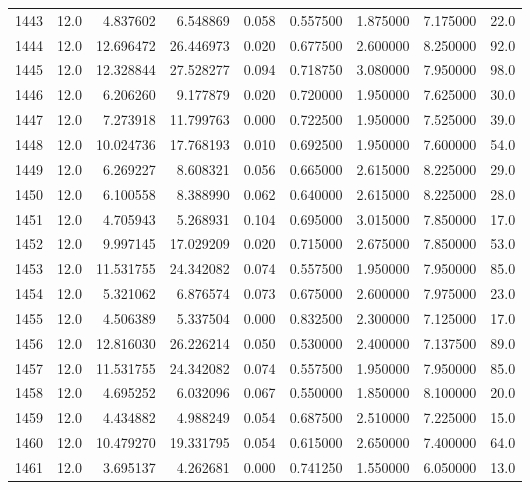 \begin{tabular}{lrrrrrrrr}
1443 &   12.0 &   4.837602 &   6.548869 &  0.058 &  0.557500 &  1.875000 &   7.175000 &   22.0 \\
1444 &   12.0 &  12.696472 &  26.446973 &  0.020 &  0.677500 &  2.600000 &   8.250000 &   92.0 \\
1445 &   12.0 &  12.328844 &  27.528277 &  0.094 &  0.718750 &  3.080000 &   7.950000 &   98.0 \\
1446 &   12.0 &   6.206260 &   9.177879 &  0.020 &  0.720000 &  1.950000 &   7.625000 &   30.0 \\
1447 &   12.0 &   7.273918 &  11.799763 &  0.000 &  0.722500 &  1.950000 &   7.525000 &   39.0 \\
1448 &   12.0 &  10.024736 &  17.768193 &  0.010 &  0.692500 &  1.950000 &   7.600000 &   54.0 \\
1449 &   12.0 &   6.269227 &   8.608321 &  0.056 &  0.665000 &  2.615000 &   8.225000 &   29.0 \\
1450 &   12.0 &   6.100558 &   8.388990 &  0.062 &  0.640000 &  2.615000 &   8.225000 &   28.0 \\
1451 &   12.0 &   4.705943 &   5.268931 &  0.104 &  0.695000 &  3.015000 &   7.850000 &   17.0 \\
1452 &   12.0 &   9.997145 &  17.029209 &  0.020 &  0.715000 &  2.675000 &   7.850000 &   53.0 \\
1453 &   12.0 &  11.531755 &  24.342082 &  0.074 &  0.557500 &  1.950000 &   7.950000 &   85.0 \\
1454 &   12.0 &   5.321062 &   6.876574 &  0.073 &  0.675000 &  2.600000 &   7.975000 &   23.0 \\
1455 &   12.0 &   4.506389 &   5.337504 &  0.000 &  0.832500 &  2.300000 &   7.125000 &   17.0 \\
1456 &   12.0 &  12.816030 &  26.226214 &  0.050 &  0.530000 &  2.400000 &   7.137500 &   89.0 \\
1457 &   12.0 &  11.531755 &  24.342082 &  0.074 &  0.557500 &  1.950000 &   7.950000 &   85.0 \\
1458 &   12.0 &   4.695252 &   6.032096 &  0.067 &  0.550000 &  1.850000 &   8.100000 &   20.0 \\
1459 &   12.0 &   4.434882 &   4.988249 &  0.054 &  0.687500 &  2.510000 &   7.225000 &   15.0 \\
1460 &   12.0 &  10.479270 &  19.331795 &  0.054 &  0.615000 &  2.650000 &   7.400000 &   64.0 \\
1461 &   12.0 &   3.695137 &   4.262681 &  0.000 &  0.741250 &  1.550000 &   6.050000 &   13.0 \\

\end{tabular}
